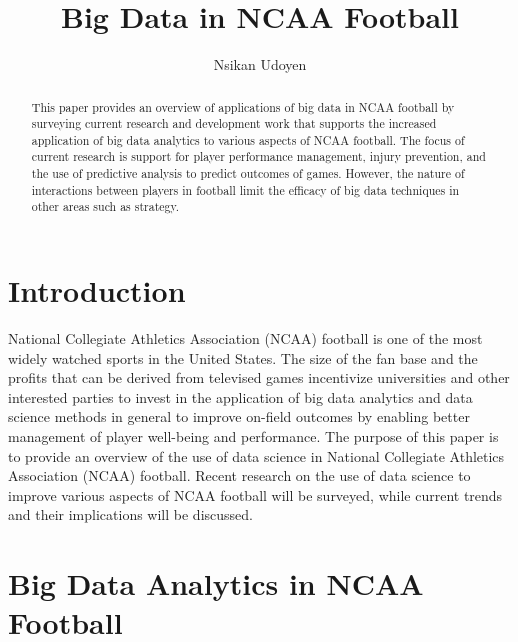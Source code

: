 \documentclass[sigconf]{acmart}
\begin{document}
\title{Big Data in NCAA Football}


\author{Nsikan Udoyen}

\renewcommand{\shortauthors}{N. Udoyen et al.}


\begin{abstract}
This paper provides an overview of applications of big data in NCAA football by surveying current research and development work that supports the increased application of big data analytics to various aspects of NCAA football. The focus of current research is support for player performance management, injury prevention, and the use of predictive analysis to predict outcomes of games. However, the nature of interactions between players in football limit the efficacy of big data techniques in other areas such as strategy.
\end{abstract}



\maketitle

\section{Introduction}

National Collegiate Athletics Association (NCAA) football is one of the most widely watched sports in the United States. 
The size of the fan base and the profits that can be derived from televised games incentivize universities and other interested parties 
to invest in the application of big data analytics and data science methods in general to improve on-field outcomes by enabling better 
management of player well-being and performance. The purpose of this paper is to provide an overview of the use of data science in 
National Collegiate Athletics Association (NCAA) football. Recent research on the use of data science to improve various aspects of NCAA 
football will be surveyed, while current trends and their implications will be discussed. 

\section{Big Data Analytics in NCAA Football}
\end{document}
